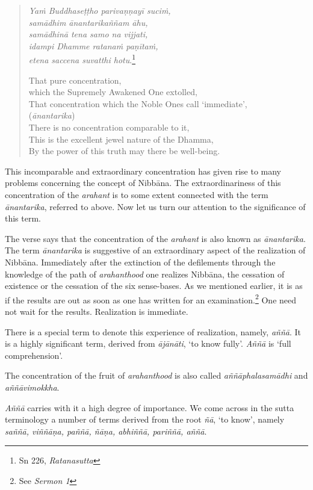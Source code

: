 \begin{quote}
\emph{Yaṁ Buddhaseṭṭho parivaṇṇayī suciṁ,}\\
\emph{samādhim ānantarikaññam āhu,}\\
\emph{samādhinā tena samo na vijjati,}\\
\emph{idampi Dhamme ratanaṁ paṇītaṁ,}\\
\emph{etena saccena suvatthi hotu}.\footnote{Sn 226, \emph{Ratanasutta}}

That pure concentration,\\
{} which the Supremely Awakened One extolled,\\
That concentration which the Noble Ones call `immediate',\\
{} (\emph{ānantarika})\\
There is no concentration comparable to it,\\
This is the excellent jewel nature of the Dhamma,\\
By the power of this truth may there be well-being.
\end{quote}

This incomparable and extraordinary concentration has given rise to many problems concerning the concept of Nibbāna. The extraordinariness of this concentration of the \emph{arahant} is to some extent connected with the term \emph{ānantarika}, referred to above. Now let us turn our attention to the significance of this term.

The verse says that the concentration of the \emph{arahant} is also known as \emph{ānantarika}. The term \emph{ānantarika} is suggestive of an extraordinary aspect of the realization of Nibbāna. Immediately after the extinction of the defilements through the knowledge of the path of \emph{arahanthood} one realizes Nibbāna, the cessation of existence or the cessation of the six sense-bases. As we mentioned earlier, it is as if the results are out as soon as one has written for an examination.\footnote{See \emph{Sermon 1}} One need not wait for the results. Realization is immediate.

There is a special term to denote this experience of realization, namely, \emph{aññā}. It is a highly significant term, derived from \emph{ājānāti}, `to know fully'. \emph{Aññā} is `full comprehension'.

The concentration of the fruit of \emph{arahanthood} is also called \emph{aññāphalasamādhi} and \emph{aññāvimokkha}.

\emph{Aññā} carries with it a high degree of importance. We come across in the sutta terminology a number of terms derived from the root \emph{ñā}, `to know', namely \emph{saññā, viññāṇa, paññā, ñāṇa, abhiññā, pariññā, aññā}.

